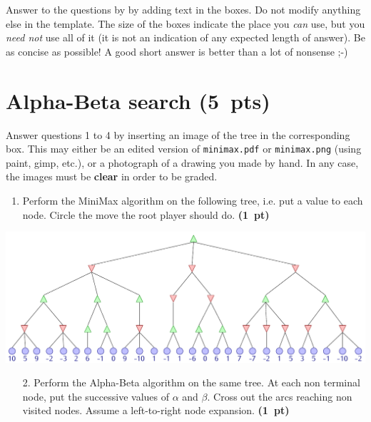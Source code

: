 \documentclass[11pt,a4paper]{report}
\begin{document}
\maketitle

Answer to the questions by by adding text in the boxes. Do not modify anything else in the template.  The size of the boxes indicate the place you \textit{can} use, but you \textit{need not} use all of it (it is not an indication of any expected length of answer). Be as concise as possible! A good short answer is better than a lot of nonsense ;-)
\bigskip

\section{Alpha-Beta search (5~pts)}

Answer questions 1 to 4 by inserting an image of the tree in the corresponding box. This may either be an edited version of \texttt{minimax.pdf} or \texttt{minimax.png} (using paint, gimp, etc.), or a photograph of a drawing you made by hand. In any case, the images must be \textbf{clear} in order to be graded.

\begin{enumerate}
\item Perform the MiniMax algorithm on the following tree, i.e.
      put a value to each node. Circle the move the root player should do. \textbf{(1~pt)}
\end{enumerate}

\begin{answers}[8cm]
\includegraphics[scale=.85]{minimax.pdf}
\end{answers}




\clearpage
\begin{enumerate}
\item[2.] Perform the Alpha-Beta algorithm on the same tree.
      At each non terminal node, put the successive values of $\alpha$ and
      $\beta$. Cross out the arcs reaching non visited nodes. Assume a
      left-to-right node expansion. \textbf{(1~pt)}
\end{enumerate}
\end{document}
